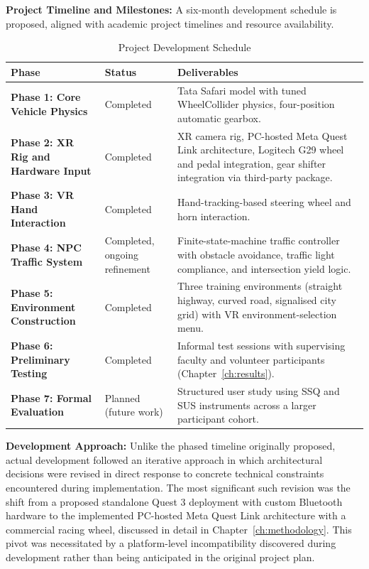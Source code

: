 \textbf{Project Timeline and Milestones:}
A six-month development schedule is proposed, aligned with academic project timelines and resource availability.

\begin{table}[h]
\caption{Project Development Schedule}
\label{tab:schedule}
\centering
\small
\begin{tabular}{|l|l|p{6cm}|}
\hline
\textbf{Phase} & \textbf{Status} & \textbf{Deliverables} \\ \hline
\textbf{Phase 1: Core Vehicle Physics} & Completed & Tata Safari model with tuned WheelCollider physics, four-position automatic gearbox. \\ \hline
\textbf{Phase 2: XR Rig and Hardware Input} & Completed & XR camera rig, PC-hosted Meta Quest Link architecture, Logitech G29 wheel and pedal integration, gear shifter integration via third-party package. \\ \hline
\textbf{Phase 3: VR Hand Interaction} & Completed & Hand-tracking-based steering wheel and horn interaction. \\ \hline
\textbf{Phase 4: NPC Traffic System} & Completed, ongoing refinement & Finite-state-machine traffic controller with obstacle avoidance, traffic light compliance, and intersection yield logic. \\ \hline
\textbf{Phase 5: Environment Construction} & Completed & Three training environments (straight highway, curved road, signalised city grid) with VR environment-selection menu. \\ \hline
\textbf{Phase 6: Preliminary Testing} & Completed & Informal test sessions with supervising faculty and volunteer participants (Chapter~\ref{ch:results}). \\ \hline
\textbf{Phase 7: Formal Evaluation} & Planned (future work) & Structured user study using SSQ and SUS instruments across a larger participant cohort. \\ \hline
\end{tabular}
\end{table}

\textbf{Development Approach:}
Unlike the phased timeline originally proposed, actual development followed an iterative approach in which architectural decisions were revised in direct response to concrete technical constraints encountered during implementation. The most significant such revision was the shift from a proposed standalone Quest 3 deployment with custom Bluetooth hardware to the implemented PC-hosted Meta Quest Link architecture with a commercial racing wheel, discussed in detail in Chapter~\ref{ch:methodology}. This pivot was necessitated by a platform-level incompatibility discovered during development rather than being anticipated in the original project plan.

